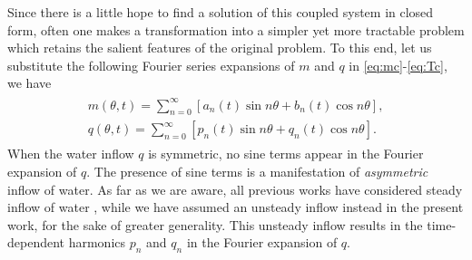 Since there is a little hope to find a solution of this 
coupled system in closed form, often one makes a transformation into a simpler yet more tractable problem which retains the salient features of the original problem. To this end, let us substitute the following Fourier series 
expansions of $m$ and $q$ in \eqref{eq:mc}-\eqref{eq:Tc}, we have
\begin{align} \label{eq:mqfe}
\begin{split}
m(\theta,t) = \sum_{n=0}^\infty [a_n(t) \sin n\theta +b_n(t) \cos n\theta],\\
q(\theta,t) = \sum_{n=0}^\infty [p_n(t) \sin n\theta +q_n(t) \cos n\theta].
\end{split}
\end{align}
When the water inflow $q$ is symmetric, no sine terms appear in the Fourier 
expansion of $q$. The presence of sine terms is a manifestation of 
\emph{asymmetric} inflow of water. As far as we are aware, all previous works have 
considered steady inflow of water \cite{Strogatz14,Lorenz63,Malkus72,KG92,MS06}, while we have assumed an unsteady inflow instead in the present work, for the sake of greater generality. This unsteady inflow results in the time-dependent 
harmonics $p_n$ and $q_n$ in the Fourier expansion of $q$.

